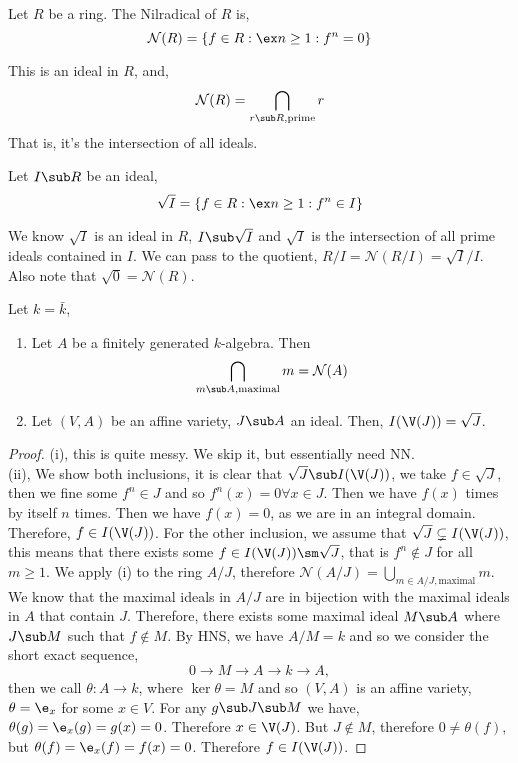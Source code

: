 \noindent
\begin{ndefi}[Nilradical]
  Let $R$ be a ring. The Nilradical of $R$ is,
  $$ \mathcal{N}(R) = \{ f \in R : \ex n \ge 1 : f^n = 0\} $$
\end{ndefi}
\noindent
This is an ideal in $R$, and,
$$ \mathcal{N}(R) = \bigcap_{r \sub R, \text{prime}} r $$
That is, it's the intersection of all ideals.
\begin{ndefi}[Radical]
  Let $I \sub R$ be an ideal,
  $$ \sqrt I = \{f \in R : \ex n \ge 1 : f^n \in I\} $$
\end{ndefi}
We know $\sqrt I$ is an ideal in $R$, $I \sub \sqrt I$ and $\sqrt I$ is the intersection of all prime ideals contained in $I$. We can pass to the quotient, $R / I = \mathcal{N}(R/I) = \sqrt I / I$. Also note that $\sqrt 0 = \mathcal{N}(R)$.

\begin{nthm}
  Let $k = \bar k$,
  \begin{enumerate}
    \item Let $A$ be a finitely generated $k$-algebra. Then
    $$ \bigcap_{m \sub A,\text{maximal}} m = \mathcal{N}(A) $$
    \item Let $(V, A)$ be an affine variety, $J \sub A$ an ideal. Then, $I(\V(J)) = \sqrt J$.
  \end{enumerate}
\end{nthm}
\begin{proof}
  (i), this is quite messy. We skip it, but essentially need NN.\\

  \noindent
  (ii), We show both inclusions, it is clear that $\sqrt J \sub I(\V(J))$, we take $f \in \sqrt J$, then we fine some $f^n \in J$ and so $f^n(x) = 0 \forall x \in J$. Then we have $f(x)$ times by itself $n$ times. Then we have $f(x) = 0$, as we are in an integral domain. Therefore, $f \in I(\V(J))$. For the other inclusion, we assume that $\sqrt J \subsetneq  I(\V(J))$, this means that there exists some $f \in I(\V(J)) \sm \sqrt J$, that is $f^n \notin J$ for all $m \ge 1$. We apply (i) to the ring $A/J$, therefore $\mathcal{N}(A/J) = \bigcup_{m \in A/J, \text{maximal}} m$.
  We know that the maximal ideals in $A/J$ are in bijection with the maximal ideals in $A$ that contain $J$. Therefore, there exists some maximal ideal $M \sub A$ where $J \sub M$ such that $f \notin M$. By HNS, we have $A/M = k$ and so we consider the short exact sequence,
  $$ 0 \to M \to A \to k \to A, $$ then we call $\theta : A \to k$, where $\ker \theta = M$ and so $(V, A)$ is an affine variety, $\theta = \e_x$ for some $x \in V$. For any $g \sub J \sub M$ we have, $\theta(g) = \e_x(g) = g(x) = 0$. Therefore $x \in \V(J)$. But $J \notin M$, therefore $0 \ne \theta(f)$, but $\theta(f) = \e_x(f) = f(x) = 0$. Therefore $f \in I(\V(J))$.
\end{proof}

